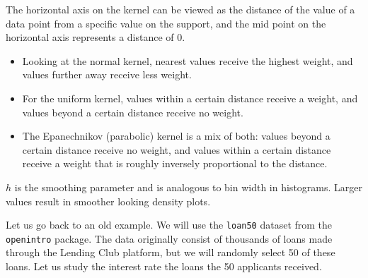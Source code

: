 \documentclass[
]{book}
\newenvironment{Shaded}{\begin{snugshade}}{\end{snugshade}}
\newcommand{\AttributeTok}[1]{\textcolor[rgb]{0.13,0.29,0.53}{#1}}
\newcommand{\DocumentationTok}[1]{\textcolor[rgb]{0.56,0.35,0.01}{\textbf{\textit{#1}}}}
\newcommand{\FunctionTok}[1]{\textcolor[rgb]{0.13,0.29,0.53}{\textbf{#1}}}
\newcommand{\NormalTok}[1]{#1}
\newcommand{\OtherTok}[1]{\textcolor[rgb]{0.56,0.35,0.01}{#1}}
\newcommand{\SpecialCharTok}[1]{\textcolor[rgb]{0.81,0.36,0.00}{\textbf{#1}}}
\newcommand{\StringTok}[1]{\textcolor[rgb]{0.31,0.60,0.02}{#1}}
\providecommand{\tightlist}{%
  \setlength{\itemsep}{0pt}\setlength{\parskip}{0pt}}
\begin{document}
The horizontal axis on the kernel can be viewed as the distance of the value of a data point from a specific value on the support, and the mid point on the horizontal axis represents a distance of 0.

\begin{itemize}
\tightlist
\item
  Looking at the normal kernel, nearest values receive the highest weight, and values further away receive less weight.
\item
  For the uniform kernel, values within a certain distance receive a weight, and values beyond a certain distance receive no weight.
\item
  The Epanechnikov (parabolic) kernel is a mix of both: values beyond a certain distance receive no weight, and values within a certain distance receive a weight that is roughly inversely proportional to the distance.
\end{itemize}

\(h\) is the smoothing parameter and is analogous to bin width in histograms. Larger values result in smoother looking density plots.

Let us go back to an old example. We will use the \texttt{loan50} dataset from the \texttt{openintro} package. The data originally consist of thousands of loans made through the Lending Club platform, but we will randomly select 50 of these loans. Let us study the interest rate the loans the 50 applicants received.

\begin{Shaded}
\end{Shaded}
\end{document}
